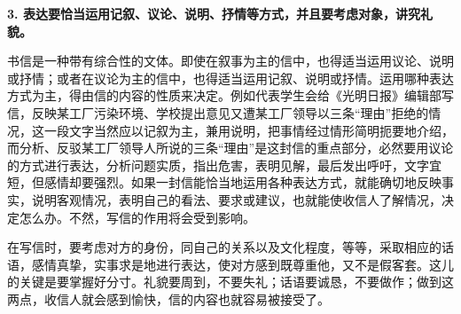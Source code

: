 \textbf{3. 表达要恰当运用记叙、议论、说明、抒情等方式，并且要考虑对象，讲究礼貌。}

书信是一种带有综合性的文体。即使在叙事为主的信中，也得适当运用议论、说明或抒情；或者在议论为主的信中，也得适当运用记叙、说明或抒情。运用哪种表达方式为主，得由信的内容的性质来决定。例如代表学生会给《光明日报》编辑部写信，反映某工厂污染环境、学校提出意见又遭某工厂领导以三条“理由”拒绝的情况，这一段文字当然应以记叙为主，兼用说明，把事情经过情形简明扼要地介绍，而分析、反驳某工厂领导人所说的三条“理由”是这封信的重点部分，必然要用议论的方式进行表达，分析问题实质，指出危害，表明见解，最后发出呼吁，文字宜短，但感情却要强烈。如果一封信能恰当地运用各种表达方式，就能确切地反映事实，说明客观情况，表明自己的看法、要求或建议，也就能使收信人了解情况，决定怎么办。不然，写信的作用将会受到影响。

在写信时，要考虑对方的身份，同自己的关系以及文化程度，等等，采取相应的话语，感情真挚，实事求是地进行表达，使对方感到既尊重他，又不是假客套。这儿的关键是要掌握好分寸。礼貌要周到，不要失礼；话语要诚恳，不要做作；做到这两点，收信人就会感到愉快，信的内容也就容易被接受了。
\newpage